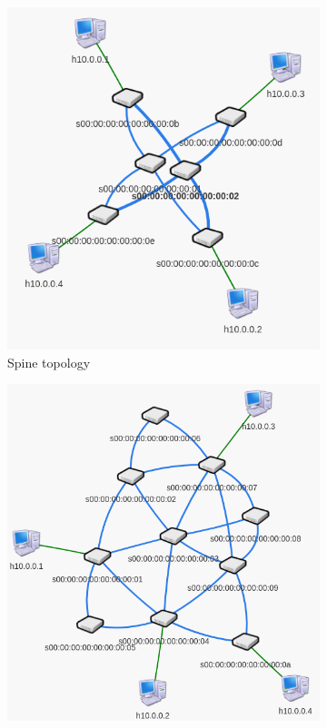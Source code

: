 \begin{figure}
	\centering
	\begin{subfigure}[b]{0.45\textwidth}
		\centering
		\includegraphics[width=\textwidth]{img/spinetopo.png}
		\caption{Spine topology}\label{subfig:spinetopo}
	\end{subfigure}
	\begin{subfigure}[b]{0.45\textwidth}
		\centering
		\includegraphics[width=\textwidth]{img/othertopo.png}

\end{subfigure}
\end{figure}
